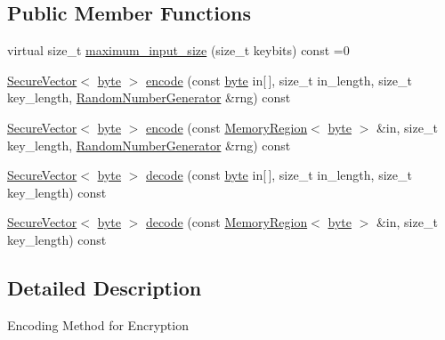 \subsection*{Public Member Functions}
\begin{DoxyCompactItemize}
\item 
virtual size\-\_\-t \hyperlink{classBotan_1_1EME_a7eefa778e39ec3226f5749be54ca2d90}{maximum\-\_\-input\-\_\-size} (size\-\_\-t keybits) const =0
\item 
\hyperlink{classBotan_1_1SecureVector}{Secure\-Vector}$<$ \hyperlink{namespaceBotan_a7d793989d801281df48c6b19616b8b84}{byte} $>$ \hyperlink{classBotan_1_1EME_aebdf4330d41ad65fae1545a7ba976d45}{encode} (const \hyperlink{namespaceBotan_a7d793989d801281df48c6b19616b8b84}{byte} in\mbox{[}$\,$\mbox{]}, size\-\_\-t in\-\_\-length, size\-\_\-t key\-\_\-length, \hyperlink{classBotan_1_1RandomNumberGenerator}{Random\-Number\-Generator} \&rng) const 
\item 
\hyperlink{classBotan_1_1SecureVector}{Secure\-Vector}$<$ \hyperlink{namespaceBotan_a7d793989d801281df48c6b19616b8b84}{byte} $>$ \hyperlink{classBotan_1_1EME_a5eeca0bc1901c57ccdb10cc837c39f84}{encode} (const \hyperlink{classBotan_1_1MemoryRegion}{Memory\-Region}$<$ \hyperlink{namespaceBotan_a7d793989d801281df48c6b19616b8b84}{byte} $>$ \&in, size\-\_\-t key\-\_\-length, \hyperlink{classBotan_1_1RandomNumberGenerator}{Random\-Number\-Generator} \&rng) const 
\item 
\hyperlink{classBotan_1_1SecureVector}{Secure\-Vector}$<$ \hyperlink{namespaceBotan_a7d793989d801281df48c6b19616b8b84}{byte} $>$ \hyperlink{classBotan_1_1EME_ad1184f82a0362488cc2d15e54b9144d2}{decode} (const \hyperlink{namespaceBotan_a7d793989d801281df48c6b19616b8b84}{byte} in\mbox{[}$\,$\mbox{]}, size\-\_\-t in\-\_\-length, size\-\_\-t key\-\_\-length) const 
\item 
\hyperlink{classBotan_1_1SecureVector}{Secure\-Vector}$<$ \hyperlink{namespaceBotan_a7d793989d801281df48c6b19616b8b84}{byte} $>$ \hyperlink{classBotan_1_1EME_ab861b376a96d78b4ce383abcda58264f}{decode} (const \hyperlink{classBotan_1_1MemoryRegion}{Memory\-Region}$<$ \hyperlink{namespaceBotan_a7d793989d801281df48c6b19616b8b84}{byte} $>$ \&in, size\-\_\-t key\-\_\-length) const 
\end{DoxyCompactItemize}


\subsection{Detailed Description}
Encoding Method for Encryption 

